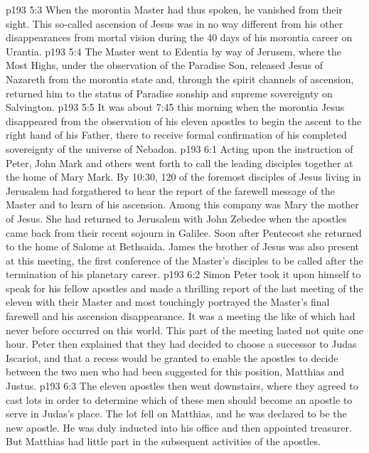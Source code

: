 \vs p193 5:3 \pc When the morontia Master had thus spoken, he vanished from their sight. This so\hyp{}called ascension of Jesus was in no way different from his other disappearances from mortal vision during the 40 days of his morontia career on Urantia.
\vs p193 5:4 The Master went to Edentia by way of Jerusem, where the Most Highs, under the observation of the Paradise Son, released Jesus of Nazareth from the morontia state and, through the spirit channels of ascension, returned him to the status of Paradise sonship and supreme sovereignty on Salvington.
\vs p193 5:5 It was about 7:45 this morning when the morontia Jesus disappeared from the observation of his eleven apostles to begin the ascent to the right hand of his Father, there to receive formal confirmation of his completed sovereignty of the universe of Nebadon.
\vs p193 6:1 Acting upon the instruction of Peter, John Mark and others went forth to call the leading disciples together at the home of Mary Mark. By 10:30, 120 of the foremost disciples of Jesus living in Jerusalem had forgathered to hear the report of the farewell message of the Master and to learn of his ascension. Among this company was Mary the mother of Jesus. She had returned to Jerusalem with John Zebedee when the apostles came back from their recent sojourn in Galilee. Soon after Pentecost she returned to the home of Salome at Bethsaida. James the brother of Jesus was also present at this meeting, the first conference of the Master’s disciples to be called after the termination of his planetary career.
\vs p193 6:2 Simon Peter took it upon himself to speak for his fellow apostles and made a thrilling report of the last meeting of the eleven with their Master and most touchingly portrayed the Master’s final farewell and his ascension disappearance. It was a meeting the like of which had never before occurred on this world. This part of the meeting lasted not quite one hour. Peter then explained that they had decided to choose a successor to Judas Iscariot, and that a recess would be granted to enable the apostles to decide between the two men who had been suggested for this position, Matthias and Justus.
\vs p193 6:3 The eleven apostles then went downstairs, where they agreed to cast lots in order to determine which of these men should become an apostle to serve in Judas’s place. The lot fell on Matthias, and he was declared to be the new apostle. He was duly inducted into his office and then appointed treasurer. But Matthias had little part in the subsequent activities of the apostles.
